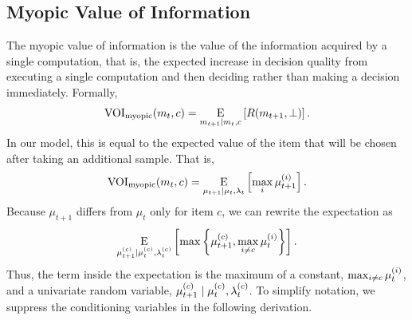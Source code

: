 \subsection{Myopic Value of Information}
The myopic value of information is the value of the information acquired by a single computation, that is, the expected increase in decision quality from executing a single computation and then deciding rather than making a decision immediately. Formally,
%
%
\begin{equation}
  \text{VOI}_\text{myopic}(m_t,c) = \operatorname*{E}_{m_{t+1} \mid m_t, c}\left[
    R(m_{t+1},\bot)
  \right].
\end{equation}
%
In our model, this is equal to the expected value of the item that will be chosen after taking an additional sample. That is,
%
%
\begin{equation}
  \text{VOI}_\text{myopic}(m_t, c) = \operatorname*{E}_{\mu_{t+1} \mid \mu_t, \lambda_t} \left[
    \max_i \mu_{t+1}^{(i)}
\right].
\end{equation}
%
Because $\mu_{t+1}$ differs from $\mu_t$ only for item $c$, we can rewrite the expectation as
%
\begin{equation}
  \label{eq:myopicmax}
  \operatorname*{E}_{\mu_{t+1}^{(c)} \mid \mu_{t}^{(c)}, \lambda_{t}^{(c)}} \left[ 
    \max \left\{ \mu_{t+1}^{(c)},\max_{i \neq c} \mu_t^{(i)} \right\} 
  \right].
\end{equation}
%
Thus, the term inside the expectation is the maximum of a constant, $\max_{i \neq c} \mu_t^{(i)}$, and a univariate random variable, $\mu_{t+1}^{(c)} \mid \mu_{t}^{(c)}, \lambda_{t}^{(c)}$. To simplify notation, we suppress the conditioning variables in the following derivation.

